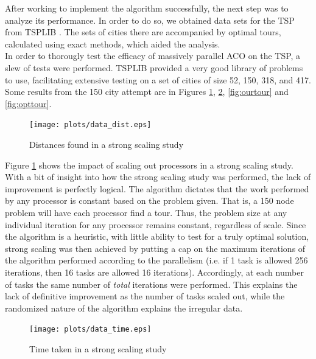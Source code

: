 \documentclass[twocolumn]{article}
\begin{document}
After working to implement the algorithm successfully, the next step was to
analyze its performance. In order to do so, we obtained data sets
for the TSP from TSPLIB \cite{tsplib}. The sets of cities
there are accompanied by optimal tours, calculated using exact methods, which
aided the analysis. \\

In order to thorougly test the efficacy of massively parallel ACO on the TSP,
a slew of tests were performed. TSPLIB provided a very good library of problems
to use, facilitating extensive testing on a set of cities of size 52, 150,
318, and 417. Some results from the 150 city attempt are in Figures \ref{fig:dist},
\ref {fig:time}, \ref{fig:ourtour} and \ref{fig:opttour}. \\

\begin{figure}
  \centering
  \texttt{[image: plots/data\_dist.eps]}
  \caption{Distances found in a strong scaling study} \label{fig:dist}
\end{figure}

Figure \ref{fig:dist} shows the impact of scaling out processors in a strong
scaling study. With a bit of insight into how the strong scaling study was
performed, the lack of improvement is perfectly logical. The algorithm dictates
that the work performed by any processor is constant based on the problem given.
That is, a 150 node problem will have each processor find a tour. Thus, the problem
size at any individual iteration for any processor remains constant, regardless of
scale. Since the algorithm is a heuristic, with little ability to test for a truly
optimal solution, strong scaling was then achieved by putting a cap on the maximum
iterations of the algorithm performed according to the parallelism (i.e. if 1 task
is allowed 256 iterations, then 16 tasks are allowed 16 iterations). Accordingly,
at each number of tasks the same number of \emph{total} iterations were performed. 
This explains the lack of definitive improvement as the number of tasks scaled out,
while the randomized nature of the algorithm explains the irregular data. \\

\begin{figure}
  \centering
  \texttt{[image: plots/data\_time.eps]}
  \caption{Time taken in a strong scaling study} \label{fig:time}
\end{figure}
\end{document}
